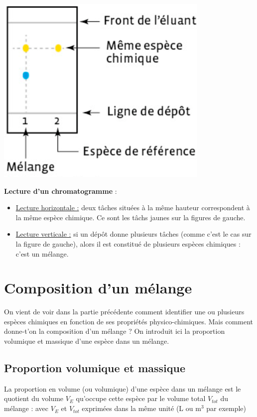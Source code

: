 \begin{minipage}[c]{0.4\textwidth}
    \includegraphics{Images/CCM.png}
\end{minipage}
\begin{minipage}[c]{0.6\textwidth}
    \textbf{Lecture d'un chromatogramme} :
    \begin{itemize}
        \item \underline{Lecture horizontale :} deux tâches situées à la même hauteur correspondent à la même espèce chimique. Ce sont les tâchs jaunes sur la figures de gauche.
        \item  \underline{Lecture verticale :} si un dépôt donne plusieurs tâches (comme c'est le cas sur la figure de gauche), alors il est constitué de plusieurs espèces chimiques : c’est un mélange.
    \end{itemize}
\end{minipage}


\section{Composition d'un mélange}
On vient de voir dans la partie précédente comment identifier une ou plusieurs espèces chimiques en fonction de ses propriétés physico-chimiques. Mais comment donne-t'on la composition d'un mélange ? On introduit ici la proportion volumique et massique d'une espèce dans un mélange.

\subsection{Proportion volumique et massique}

\begin{tcolorbox}[colback=green!5!white,colframe=green!75!black,title=\textbf{Proportion volumique}]
La proportion en volume (ou volumique) d'une espèce dans un mélange est le quotient du volume $V_{E}$ qu'occupe cette espèce par le volume total $V_{tot}$ du mélange :
\newline
\newline
\newline
\newline
avec $V_{E}$ et $V_{tot}$ exprimées dans la même unité (L ou m$^3$ par exemple)\end{tcolorbox}

